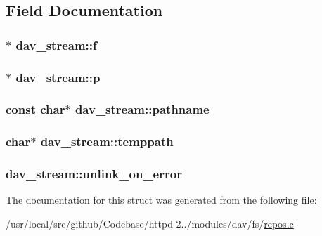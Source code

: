 \subsection{Field Documentation}
\subsubsection[{\texorpdfstring{f}{f}}]{$\ast$ dav\+\_\+stream\+::f}\hypertarget{structdav__stream_a50a0b7cf28fa2c4206ddfebfa326fb7c}{}\label{structdav__stream_a50a0b7cf28fa2c4206ddfebfa326fb7c}
\subsubsection[{\texorpdfstring{p}{p}}]{$\ast$ dav\+\_\+stream\+::p}\hypertarget{structdav__stream_a2cfc6e47f1f7dddc4fea14012efe76b7}{}\label{structdav__stream_a2cfc6e47f1f7dddc4fea14012efe76b7}
\subsubsection[{\texorpdfstring{pathname}{pathname}}]{\setlength{\rightskip}{0pt plus 5cm}const char$\ast$ dav\+\_\+stream\+::pathname}\hypertarget{structdav__stream_a18d9d8708539e26076a52e71dc9dc0b0}{}\label{structdav__stream_a18d9d8708539e26076a52e71dc9dc0b0}
\subsubsection[{\texorpdfstring{temppath}{temppath}}]{\setlength{\rightskip}{0pt plus 5cm}char$\ast$ dav\+\_\+stream\+::temppath}\hypertarget{structdav__stream_a0d9b720a6599dc3c2a43bfbba84daa26}{}\label{structdav__stream_a0d9b720a6599dc3c2a43bfbba84daa26}
\subsubsection[{\texorpdfstring{unlink\+\_\+on\+\_\+error}{unlink_on_error}}]{ dav\+\_\+stream\+::unlink\+\_\+on\+\_\+error}\hypertarget{structdav__stream_aa290966dae6b8dadef59fb728ecb418a}{}\label{structdav__stream_aa290966dae6b8dadef59fb728ecb418a}


The documentation for this struct was generated from the following file\+:\begin{DoxyCompactItemize}
\item 
/usr/local/src/github/\+Codebase/httpd-\/2../modules/dav/fs/\hyperlink{repos_8c}{repos.\+c}\end{DoxyCompactItemize}
